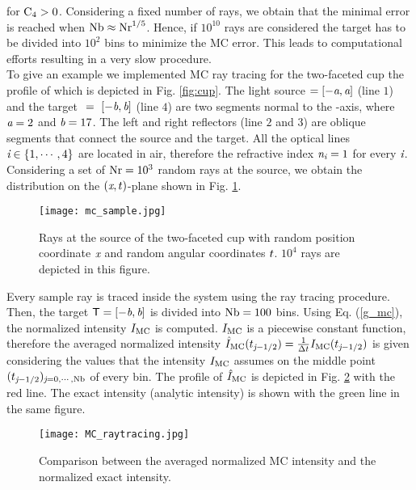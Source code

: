 for $\textrm{C}_4>0$.
Considering a fixed number of rays, we obtain that the minimal error is reached when $\textrm{Nb}\approx \textrm{Nr}^{1/5}$.
Hence, if $10^{10}$ rays are considered the target has to be divided into $10^2$ bins to minimize the MC error.
This leads to computational efforts resulting in a very slow procedure.\\ \indent
To give an example we implemented MC ray tracing for the two-faceted cup the profile of which is depicted in Fig. \ref{fig:cup}. 
The light source $= [-\textit{a}, \textit{a}]$ (line $1$) and the target $~=~ [-\textit{b}, \textit{b}]$ (line $4$) are two segments normal to the -axis, where $\textit{a}=2$ and $\textit{b}=17$.
The left and right reflectors (line $2$ and $3$) are oblique segments that connect the source and the target.
All the optical lines $\textit{i} \in \{1, \cdots, 4\}$  are located in air, therefore the refractive index $\textit{n}_{\textit{i}}=1$ for every $\textit{i}$.
Considering a set of $\textrm{Nr} = 10^3$ random rays 
at the source, we obtain the distribution on the $(\textit{x}, t)$-plane shown in Fig. \ref{fig:mc_sample}.
\begin{figure}[h]
\begin{center}
    \texttt{[image: mc\_sample.jpg]}
    \caption{Rays at the source of the two-faceted cup with random position coordinate $\textit{x}$ and random angular coordinates $t$. $10^4$ rays are depicted in this figure.}
    \label{fig:mc_sample}
\end{center}
  \end{figure}
Every sample ray is traced inside the system using the ray tracing procedure. Then, the target $\textsf{T} = [-\textit{b}, \textit{b}]$ is divided into $\textrm{Nb}= 100$ bins.
Using Eq. (\ref{g_mc}), the normalized intensity $I_{\textrm{MC}}$ is computed. $I_{\textrm{MC}}$  is a piecewise constant function, therefore the averaged normalized intensity  $\hat{I}_{\textrm{MC}}(t_{\textit{j}-1/2})= \frac{1}{\Delta t}I_{\textrm{MC}}(t_{\textit{j}-1/2})$ is given considering the values that the intensity  $I_{\textrm{MC}}$ assumes on the middle point $(t_{\textit{j}-1/2})_{\textit{j} = 0, \cdots, \textrm{Nb}}$ of every bin. The profile of $\hat{I}_{\textrm{MC}}$ is depicted in Fig. \ref{fig:mc_intensity} with the red line. The exact intensity (analytic intensity) is shown with the green line in the same figure.
\begin{figure}[t]
\begin{center}
    \texttt{[image: MC\_raytracing.jpg]}
    \caption{Comparison between the averaged normalized MC intensity and the normalized exact intensity.}
   \label{fig:mc_intensity}
\end{center}
\end{figure}

